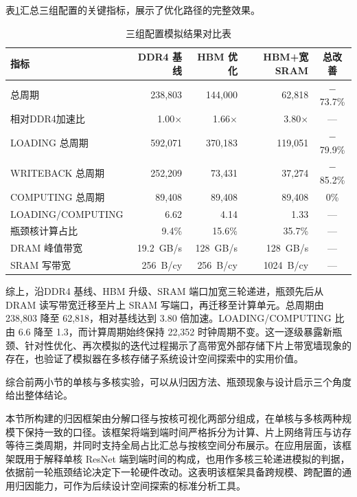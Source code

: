 表\ref{tab:c5_comparison}汇总三组配置的关键指标，展示了优化路径的完整效果。

\begin{table}[H]
  \centering
  \caption{三组配置模拟结果对比表}
  \label{tab:c5_comparison}
  \small
  \begin{tabular*}{\textwidth}{@{\extracolsep{\fill}}lrrrc}
    \toprule
    指标 & DDR4 基线 & HBM 优化 & HBM+宽SRAM & 总改善 \\
    \midrule
    总周期            & 238,803   & 144,000  & 62,818   & $-$73.7\% \\
    相对DDR4加速比    & 1.00$\times$ & 1.66$\times$ & 3.80$\times$ & --- \\
    LOADING 总周期    & 592,071   & 370,183  & 119,051  & $-$79.9\% \\
    WRITEBACK 总周期  & 252,209   & 73,431   & 37,274   & $-$85.2\% \\
    COMPUTING 总周期  & 89,408    & 89,408   & 89,408   & 0\% \\
    LOADING/COMPUTING & 6.62       & 4.14      & 1.33      & --- \\
    瓶颈核计算占比    & 9.4\%      & 15.6\%    & 35.7\%    & --- \\
    DRAM 峰值带宽     & \SI{19.2}{GB/s} & \SI{128}{GB/s} & \SI{128}{GB/s} & --- \\
    SRAM 写带宽       & \SI{256}{B/cy}  & \SI{256}{B/cy} & \SI{1024}{B/cy} & --- \\
    \bottomrule
  \end{tabular*}
\end{table}

综上，沿DDR4 基线、HBM 升级、SRAM 端口加宽三轮递进，瓶颈先后从 DRAM 读写带宽迁移至片上 SRAM 写端口，再迁移至计算单元。总周期由 238,803 降至 62,818，相对基线达到 3.80 倍加速。LOADING/COMPUTING 比由 6.6 降至 1.3，而计算周期始终保持 22,352 时钟周期不变。这一逐级暴露新瓶颈、针对性优化、再次模拟的迭代过程揭示了高带宽外部存储下片上带宽墙现象的存在，也验证了模拟器在多核存储子系统设计空间探索中的实用价值。

\label{subsec:c4_bot_conclusion}
\label{subsec:c5_bottleneck_overall}

综合前两小节的单核与多核实验，可以从归因方法、瓶颈现象与设计启示三个角度给出整体结论。

本节所构建的归因框架由分解口径与按核可视化两部分组成，在单核与多核两种规模下保持一致的口径。该框架将端到端时间严格拆分为计算、片上网络背压与访存等待三类周期，并同时支持全局占比汇总与按核空间分布展示。在应用层面，该框架既用于解释单核 ResNet 端到端时间的构成，也用作多核三轮递进模拟的判据，依据前一轮瓶颈结论决定下一轮硬件改动。这表明该框架具备跨规模、跨配置的通用归因能力，可作为后续设计空间探索的标准分析工具。

